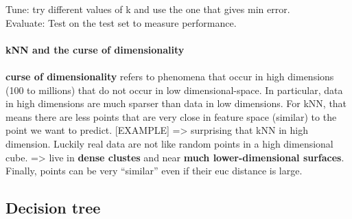 Tune: try different values of k and use the one that gives min error. \\
Evaluate: Test on the test set to measure performance. \\\\
\textbf{kNN and the curse of dimensionality} 
\\\\
\textbf{curse of dimensionality} refers to phenomena that occur in high dimensions (100 to millions) that do not occur in low dimensional-space. In particular, data in high dimensions are much sparser than data in low dimensions. For kNN, that means there are less points that are very close in feature space (similar) to the point we want to predict. [EXAMPLE] => surprising that kNN in high dimension. Luckily real data are not like random points in a high dimensional cube. => live in \textbf{dense clustes} and near \textbf{much lower-dimensional surfaces}. Finally, points can be very ``similar'' even if their euc distance is large.

\subsection{Decision tree}

